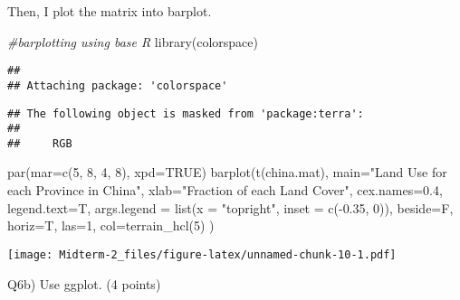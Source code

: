 \documentclass[
]{article}
\newenvironment{Shaded}{\begin{snugshade}}{\end{snugshade}}
\newcommand{\AttributeTok}[1]{\textcolor[rgb]{0.77,0.63,0.00}{#1}}
\newcommand{\CommentTok}[1]{\textcolor[rgb]{0.56,0.35,0.01}{\textit{#1}}}
\newcommand{\ConstantTok}[1]{\textcolor[rgb]{0.00,0.00,0.00}{#1}}
\newcommand{\DecValTok}[1]{\textcolor[rgb]{0.00,0.00,0.81}{#1}}
\newcommand{\FloatTok}[1]{\textcolor[rgb]{0.00,0.00,0.81}{#1}}
\newcommand{\FunctionTok}[1]{\textcolor[rgb]{0.00,0.00,0.00}{#1}}
\newcommand{\NormalTok}[1]{#1}
\newcommand{\SpecialCharTok}[1]{\textcolor[rgb]{0.00,0.00,0.00}{#1}}
\newcommand{\StringTok}[1]{\textcolor[rgb]{0.31,0.60,0.02}{#1}}
\begin{document}
Then, I plot the matrix into barplot.

\begin{Shaded}
\begin{Highlighting}[]
\CommentTok{\#barplotting using base R}
\FunctionTok{library}\NormalTok{(colorspace)}
\end{Highlighting}
\end{Shaded}

\begin{verbatim}
## 
## Attaching package: 'colorspace'
\end{verbatim}

\begin{verbatim}
## The following object is masked from 'package:terra':
## 
##     RGB
\end{verbatim}

\begin{Shaded}
\begin{Highlighting}[]
\FunctionTok{par}\NormalTok{(}\AttributeTok{mar=}\FunctionTok{c}\NormalTok{(}\DecValTok{5}\NormalTok{, }\DecValTok{8}\NormalTok{, }\DecValTok{4}\NormalTok{, }\DecValTok{8}\NormalTok{), }\AttributeTok{xpd=}\ConstantTok{TRUE}\NormalTok{)}
\FunctionTok{barplot}\NormalTok{(}\FunctionTok{t}\NormalTok{(china.mat), }
        \AttributeTok{main=}\StringTok{"Land Use for each Province in China"}\NormalTok{, }
        \AttributeTok{xlab=}\StringTok{"Fraction of each Land Cover"}\NormalTok{,}
        \AttributeTok{cex.names=}\FloatTok{0.4}\NormalTok{,}
        \AttributeTok{legend.text=}\NormalTok{T,}
        \AttributeTok{args.legend =} \FunctionTok{list}\NormalTok{(}\AttributeTok{x =} \StringTok{"topright"}\NormalTok{, }\AttributeTok{inset =} \FunctionTok{c}\NormalTok{(}\SpecialCharTok{{-}}\FloatTok{0.35}\NormalTok{, }\DecValTok{0}\NormalTok{)),}
        \AttributeTok{beside=}\NormalTok{F, }
        \AttributeTok{horiz=}\NormalTok{T, }
        \AttributeTok{las=}\DecValTok{1}\NormalTok{, }
        \AttributeTok{col=}\FunctionTok{terrain\_hcl}\NormalTok{(}\DecValTok{5}\NormalTok{)}
\NormalTok{        )}
\end{Highlighting}
\end{Shaded}

\texttt{[image: Midterm-2\_files/figure-latex/unnamed-chunk-10-1.pdf]}

Q6b) Use ggplot. (4 points)
\end{document}
